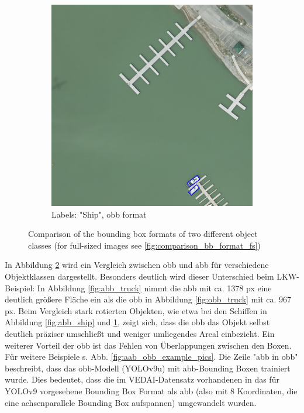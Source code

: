 \begin{figure}[h]
\begin{subfigure}[b]{0.45\textwidth}
        \includegraphics[trim={680pt 50pt 250pt 865pt},clip,width=\textwidth]{images/015Results/01abb_vs_obb/obb_ship.png}
        \caption{Labels: "Ship", obb format}
        \label{fig:obb_ship}
    \end{subfigure}  
    \caption[Comparison of the bounding box formats of two different object classes]{Comparison of the bounding box formats of two different object classes (for full-sized images see \ref{fig:comparison_bb_format_fs})}
    \label{fig:comparison_bb_format}
\end{figure}


In Abbildung \ref{fig:comparison_bb_format} wird ein Vergleich zwischen \acrshort{obb} und \acrshort{abb} für verschiedene Objektklassen dargestellt. Besonders deutlich wird dieser Unterschied beim LKW-Beispiel: In Abbildung \ref{fig:abb_truck} nimmt die \acrshort{abb} mit ca. 1378 px eine deutlich größere Fläche ein als die \acrshort{obb} in Abbildung \ref{fig:obb_truck} mit ca. 967 px. Beim Vergleich stark rotierten Objekten, wie etwa bei den Schiffen in Abbildung \ref{fig:abb_ship} und \ref{fig:obb_ship}, zeigt sich, dass die \acrshort{obb} das Objekt selbst deutlich präziser umschließt und weniger umliegendes Areal einbezieht. Ein weiterer Vorteil der \acrshort{obb} ist das Fehlen von Überlappungen zwischen den Boxen. Für weitere Beispiele s. Abb. \ref{fig:aab_obb_example_pics}. Die Zeile "abb in obb" beschreibt, dass das \acrshort{obb}-Modell (\acrshort{YOLO}v9u) mit \acrshort{abb}-Bounding Boxen trainiert wurde. Dies bedeutet, dass die im \acrshort{VEDAI}-Datensatz vorhandenen  in das für \acrshort{YOLO}v9 vorgesehene Bounding Box Format  als \acrshort{abb} (also mit 8 Koordinaten, die eine achsenparallele Bounding Box aufspannen) umgewandelt wurden. 

